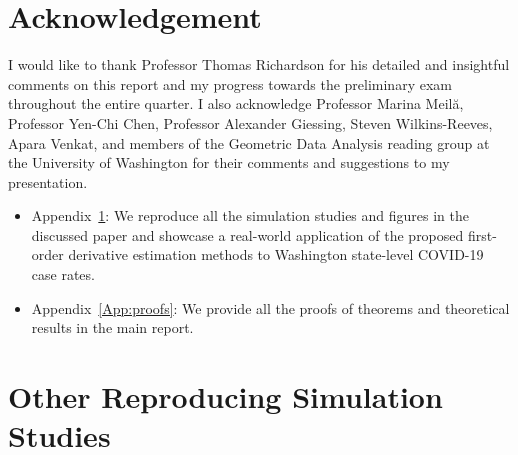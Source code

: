 \documentclass{uwstat572}
\theoremstyle{definition}
\theoremstyle{theorem}
\begin{document}
\pagebreak

\section*{Acknowledgement}

I would like to thank Professor Thomas Richardson for his detailed and insightful comments on this report and my progress towards the preliminary exam throughout the entire quarter. I also acknowledge Professor Marina Meil\u{a}, Professor Yen-Chi Chen, Professor Alexander Giessing, Steven Wilkins-Reeves, Apara Venkat, and members of the Geometric Data Analysis reading group at the University of Washington for their comments and suggestions to my presentation.



\appendix

\vspace{10mm}

\begin{itemize}
	\item Appendix~\ref{App:repro}: We reproduce all the simulation studies and figures in the discussed paper \citep{liu2020smoothed} and showcase a real-world application of the proposed first-order derivative estimation methods to Washington state-level COVID-19 case rates.
	
	\item Appendix~\ref{App:proofs}: We provide all the proofs of theorems and theoretical results in the main report.
\end{itemize}


\section{Other Reproducing Simulation Studies}
\label{App:repro}
\end{document}
